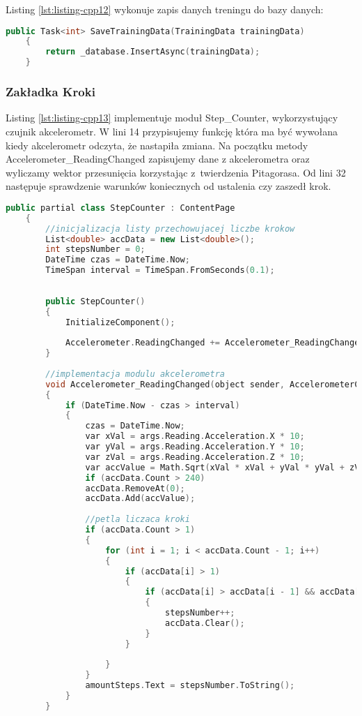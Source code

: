 Listing \ref{lst:listing-cpp12} wykonuje zapis danych treningu do bazy danych:
\begin{lstlisting}[caption=Zapis danych do bazy danych, label={lst:listing-cpp12}, language=C++]
	public Task<int> SaveTrainingData(TrainingData trainingData)      
	{
		return _database.InsertAsync(trainingData);
	}
\end{lstlisting}

\subsubsection{Zakładka Kroki} %

\hspace{0.60cm}Listing \ref{lst:listing-cpp13} implementuje moduł Step\_Counter, wykorzystujący czujnik akcelerometr. W lini 14 przypisujemy funkcję która ma być wywołana kiedy akcelerometr odczyta, że nastapiła zmiana. Na początku metody Accelerometer\_ReadingChanged zapisujemy dane z akcelerometra oraz wyliczamy wektor przesunięcia korzystając z~twierdzenia Pitagorasa. Od lini 32 następuje sprawdzenie warunków koniecznych od ustalenia czy zaszedł krok.
\begin{lstlisting}[caption=Krakomierz i akcelerometr, label={lst:listing-cpp13}, language=C++]
	public partial class StepCounter : ContentPage
	{
		//inicjalizacja listy przechowujacej liczbe krokow
		List<double> accData = new List<double>();
		int stepsNumber = 0;
		DateTime czas = DateTime.Now;
		TimeSpan interval = TimeSpan.FromSeconds(0.1);
		
		
		public StepCounter()
		{
			InitializeComponent();
			
			Accelerometer.ReadingChanged += Accelerometer_ReadingChanged;
		}
		
		//implementacja modulu akcelerometra
		void Accelerometer_ReadingChanged(object sender, AccelerometerChangedEventArgs args)
		{
			if (DateTime.Now - czas > interval)
			{
				czas = DateTime.Now;
				var xVal = args.Reading.Acceleration.X * 10;
				var yVal = args.Reading.Acceleration.Y * 10;
				var zVal = args.Reading.Acceleration.Z * 10;
				var accValue = Math.Sqrt(xVal * xVal + yVal * yVal + zVal * zVal) - 10;
				if (accData.Count > 240)
				accData.RemoveAt(0);
				accData.Add(accValue);
				
				//petla liczaca kroki
				if (accData.Count > 1)
				{
					for (int i = 1; i < accData.Count - 1; i++)
					{
						if (accData[i] > 1)
						{
							if (accData[i] > accData[i - 1] && accData[i] > accData[i + 1])
							{
								stepsNumber++;
								accData.Clear();
							}
						}
						
					}
				}
				amountSteps.Text = stepsNumber.ToString();
			}
		}
\end{lstlisting}

